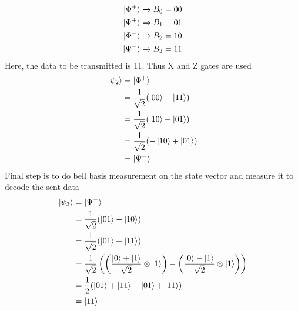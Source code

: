 \documentclass[12pt]{article}
\begin{document}
  \begin{equation*}
    \begin{split}
      \ket{\Phi^+} \xrightarrow{} B_0 = 00\\
      \ket{\Psi^+} \xrightarrow{} B_1 = 01\\
      \ket{\Phi^-} \xrightarrow{} B_2 = 10\\
      \ket{\Psi^-} \xrightarrow{} B_3 = 11\\
    \end{split}
  \end{equation*}
  Here, the data to be transmitted is 11. Thus X and Z gates are used
  \begin{equation*}
    \begin{split}
      \ket{\psi_2} & = \ket{\Phi^+}\\
      & = \frac{1}{\sqrt{2}}(\ket{00} + \ket{11})\\
      & = \frac{1}{\sqrt{2}}(\ket{10} + \ket{01})\\
      & = \frac{1}{\sqrt{2}}(-\ket{10} + \ket{01})\\
      & = \ket{\Psi^-}
    \end{split}
  \end{equation*}
  Final step is to do bell basis measurement on the state vector and measure it to decode the sent data
  \begin{equation*}
    \begin{split}
      \ket{\psi_3} & = \ket{\Psi^-}\\
      & = \frac{1}{\sqrt{2}}(\ket{01} - \ket{10})\\
      & = \frac{1}{\sqrt{2}}(\ket{01} + \ket{11})\\
      & = \frac{1}{\sqrt{2}} \left( \left( \frac{\ket{0} + \ket{1}}{\sqrt{2}} \otimes \ket{1} \right) - \left( \frac{\ket{0} - \ket{1}}{\sqrt{2}} \otimes \ket{1} \right) \right)\\
      & = \frac{1}{2}(\ket{01} + \ket{11} - \ket{01} + \ket{11})\\
      & = \ket{11}
    \end{split}
  \end{equation*}  
\end{document}
